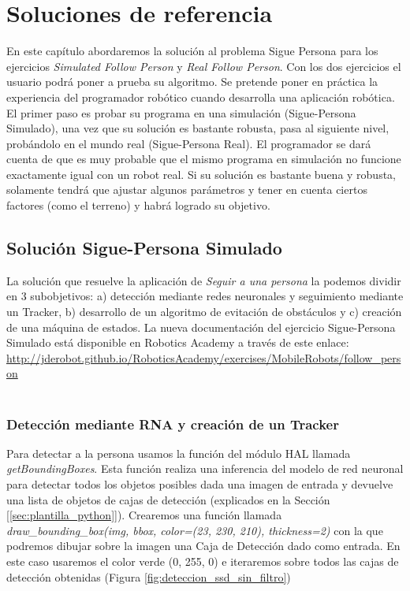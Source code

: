 \chapter{Soluciones de referencia}
\label{cap:capitulo6}

En este capítulo abordaremos la solución al problema Sigue Persona para los ejercicios \textit{Simulated Follow Person} y \textit{Real Follow Person}. Con los dos ejercicios el usuario podrá poner a prueba su algoritmo. Se pretende poner en práctica la experiencia del programador robótico cuando desarrolla una aplicación robótica. El primer paso es probar su programa en una simulación (Sigue-Persona Simulado), una vez que su solución es bastante robusta, pasa al siguiente nivel, probándolo en el mundo real (Sigue-Persona Real). El programador se dará cuenta de que es muy probable que el mismo programa en simulación no funcione exactamente igual con un robot real. Si su solución es bastante buena y robusta, solamente tendrá que ajustar algunos parámetros y tener en cuenta ciertos factores (como el terreno) y habrá logrado su objetivo.\\

\section{Solución Sigue-Persona Simulado}
\label{sec:solucion_sigue_personas_simulado}

La solución que resuelve la aplicación de \textit{Seguir a una persona} la podemos dividir en 3 subobjetivos: a) detección mediante redes neuronales y seguimiento mediante un Tracker, b) desarrollo de un algoritmo de evitación de obstáculos y c) creación de una máquina de estados. La nueva documentación del ejercicio Sigue-Persona Simulado está disponible en Robotics Academy a través de este enlace: \url{http://jderobot.github.io/RoboticsAcademy/exercises/MobileRobots/follow_person}\\\\



\subsection{Detección mediante RNA y creación de un Tracker}
\label{subsec:ml_tracker}
Para detectar a la persona usamos la función del módulo HAL llamada \textit{getBoundingBoxes}. Esta función realiza una inferencia del modelo de red neuronal para detectar todos los objetos posibles dada una imagen de entrada y devuelve una lista de objetos de cajas de detección (explicados en la Sección [\ref{sec:plantilla_python}]). Crearemos una función llamada \textit{draw\_bounding\_box(img, bbox, color=(23, 230, 210), thickness=2)} con la que podremos dibujar sobre la imagen una Caja de Detección dado como entrada. En este caso usaremos el color verde (0, 255, 0) e iteraremos sobre todos las cajas de detección obtenidas (Figura \ref{fig:deteccion_ssd_sin_filtro})\\

